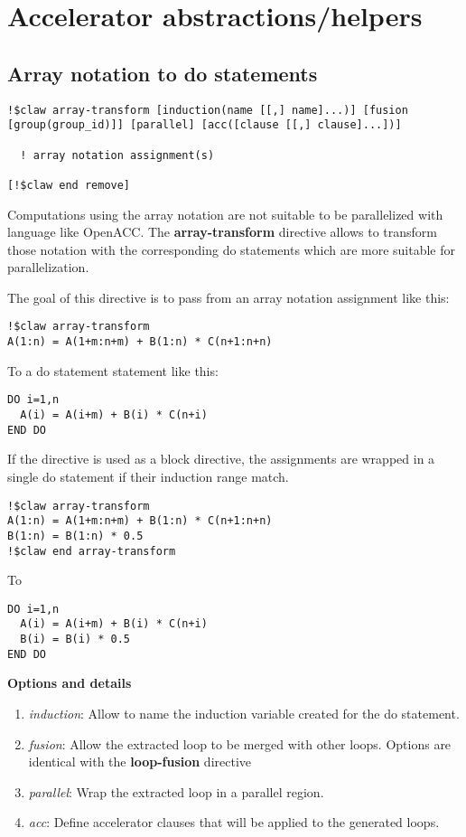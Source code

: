 \section{Accelerator abstractions/helpers}

\subsection{Array notation to do statements}

\begin{lstlisting}
!$claw array-transform [induction(name [[,] name]...)] [fusion [group(group_id)]] [parallel] [acc([clause [[,] clause]...])]

  ! array notation assignment(s) 
  
[!$claw end remove]
\end{lstlisting}

Computations using the array notation are not suitable to be parallelized with
language like OpenACC. The \textbf{array-transform} directive allows to transform those
notation with the corresponding do statements which are more suitable for
parallelization.

The goal of this directive is to pass from an array notation assignment like
this:

\begin{lstlisting}
!$claw array-transform
A(1:n) = A(1+m:n+m) + B(1:n) * C(n+1:n+n)
\end{lstlisting}

To a do statement statement like this:

\begin{lstlisting}
DO i=1,n
  A(i) = A(i+m) + B(i) * C(n+i)
END DO
\end{lstlisting}

If the directive is used as a block directive, the assignments are wrapped in
a single do statement if their induction range match.

\begin{lstlisting}
!$claw array-transform
A(1:n) = A(1+m:n+m) + B(1:n) * C(n+1:n+n)
B(1:n) = B(1:n) * 0.5
!$claw end array-transform
\end{lstlisting}

To

\begin{lstlisting}
DO i=1,n
  A(i) = A(i+m) + B(i) * C(n+i)
  B(i) = B(i) * 0.5
END DO
\end{lstlisting}


\textbf{Options and details}
\begin{enumerate}
\item \textit{induction}: Allow to name the induction variable created for the do statement.
\item \textit{fusion}: Allow the extracted loop to be merged with other loops. Options 
are identical with the \textbf{loop-fusion} directive
\item \textit{parallel}: Wrap the extracted loop in a parallel region.
\item \textit{acc}: Define accelerator clauses that will be applied to the generated loops.
\end{enumerate}

